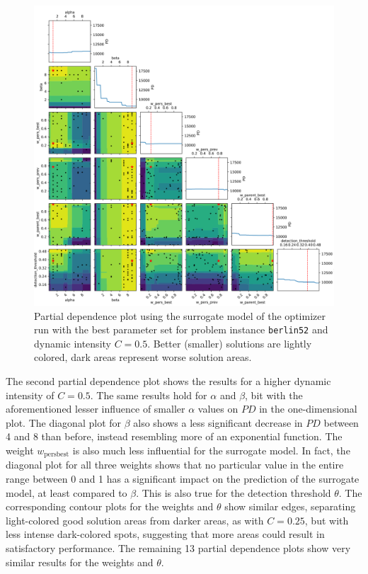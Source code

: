 \begin{figure}[h!]
	\centering
	\centerline{\includegraphics[width=1.2\textwidth]{results/part2/partial_dependence_berlin52_C_0.5_run_4.svg}}
	\caption[Partial dependence plot for \texttt{berlin52} and $C=0.5$]{Partial dependence plot using the surrogate model of the optimizer run with the best parameter set for problem instance \texttt{berlin52} and dynamic intensity $C=0.5$. Better (smaller) solutions are lightly colored, dark areas represent worse solution areas.}
	\label{fig:partial_dependence_berlin52_C_05}
\end{figure}

The second partial dependence plot shows the results for a higher dynamic intensity of $C=0.5$. 
The same results hold for $\alpha$ and $\beta$, bit with the aforementioned lesser influence of smaller $\alpha$ values on $PD$ in the one-dimensional plot. The diagonal plot for $\beta$ also shows a less significant decrease in $PD$ between 4 and 8 than before, instead resembling more of an exponential function. The weight $w_{\text{persbest}}$ is also much less influential for the surrogate model. In fact, the diagonal plot for all three weights shows that no particular value in the entire range between 0 and 1 has a significant impact on the prediction of the surrogate model, at least compared to $\beta$. This is also true for the detection threshold $\theta$. The corresponding contour plots for the weights and $\theta$ show similar edges, separating light-colored good solution areas from darker areas, as with $C=0.25$, but with less intense dark-colored spots, suggesting that more areas could result in satisfactory performance. The remaining 13 partial dependence plots show very similar results for the weights and $\theta$.

